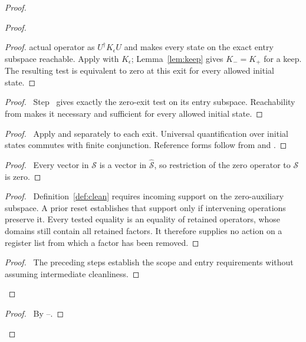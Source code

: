 \begin{proof}
\begin{proof}
\begin{proof}
 actual operator as $U^\dagger K_\epsilon U$ and makes every state
 on the exact entry subspace reachable. Apply
  with $K_\epsilon$; Lemma~\ref{lem:keep}
 gives $K_-=K_+$ for a keep. The resulting test is equivalent to
 zero at this exit for every allowed initial state.\end{proof}
 \begin{proof}\pf\ Step~ gives exactly
 the zero-exit test on its entry subspace. Reachability from
  makes it necessary and sufficient for
 every allowed initial state.\end{proof}
 \begin{proof}\pf\ Apply  and
  separately to each exit. Universal
 quantification over initial states commutes with finite conjunction.
 Reference forms follow from  and
 .\end{proof}
 \begin{proof}\pf\ Every vector in $\mathcal S$ is a vector in
 $\widehat{\mathcal S}$, so restriction of the zero operator to
 $\mathcal S$ is zero.\end{proof}
 \begin{proof}\pf\ Definition~\ref{def:clean} requires incoming
 support on the zero-auxiliary subspace. A prior reset establishes
 that support only if intervening operations preserve it. Every
 tested equality is an equality of retained operators, whose
 domains still contain all retained factors. It therefore supplies
 no action on a register list from which a factor has been removed.
 \end{proof}
 \qedstep
 \begin{proof}\pf\ The preceding steps establish the scope and
 entry requirements without assuming intermediate cleanliness.
 \end{proof}
\end{proof}
 \qedstep
 \begin{proof}\pf\ By --.
 \end{proof}
\end{proof}

